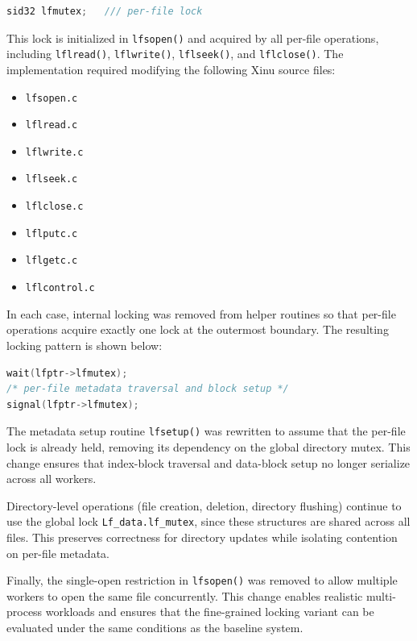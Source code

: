 \documentclass[sigconf]{acmart}
\begin{document}
\begin{lstlisting}[language=C]
sid32 lfmutex;   /// per-file lock
\end{lstlisting}

This lock is initialized in \texttt{lfsopen()} and acquired by all per-file operations, including \texttt{lflread()}, \texttt{lflwrite()}, \texttt{lflseek()}, and \texttt{lflclose()}. The implementation required modifying the following Xinu source files:

\begin{itemize}
    \item \texttt{lfsopen.c}
    \item \texttt{lflread.c}
    \item \texttt{lflwrite.c}
    \item \texttt{lflseek.c}
    \item \texttt{lflclose.c}
    \item \texttt{lflputc.c}
    \item \texttt{lflgetc.c}
    \item \texttt{lflcontrol.c}
\end{itemize}

In each case, internal locking was removed from helper routines so that per-file operations acquire exactly one lock at the outermost boundary. The resulting locking pattern is shown below:

\begin{lstlisting}[language=C]
wait(lfptr->lfmutex);
/* per-file metadata traversal and block setup */
signal(lfptr->lfmutex);
\end{lstlisting}

The metadata setup routine \texttt{lfsetup()} was rewritten to assume that the per-file lock is already held, removing its dependency on the global directory mutex. This change ensures that index-block traversal and data-block setup no longer serialize across all workers.

Directory-level operations (file creation, deletion, directory
flushing) continue to use the global lock \texttt{Lf\_data.lf\_mutex}, since these structures are shared across all files. This preserves correctness for directory updates while isolating contention on per-file metadata.

Finally, the single-open restriction in \texttt{lfsopen()} was removed to allow multiple workers to open the same file concurrently. This change enables realistic multi-process workloads and ensures that the fine-grained locking variant can be evaluated under the same conditions as the baseline system.
\end{document}
